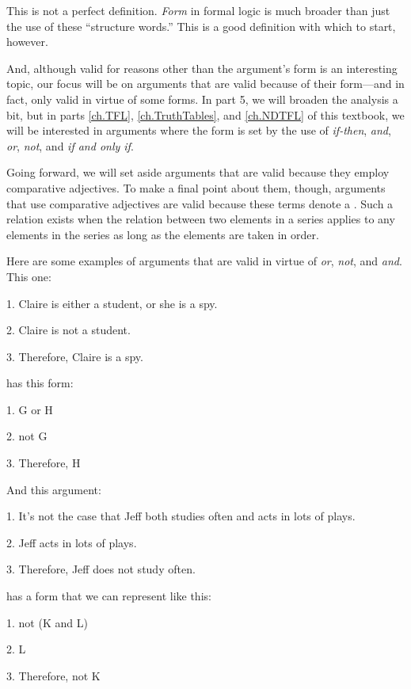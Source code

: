 \noindent This is not a perfect definition. \textit{Form} in formal logic is much broader than just the use of these ``structure words.'' This is a good definition with which to start, however.

And, although valid for reasons other than the argument's form is an interesting topic, our focus will be on arguments that are valid because of their form---and in fact, only valid in virtue of some forms. In part 5, we will broaden the analysis a bit, but in parts  \ref{ch.TFL}, \ref{ch.TruthTables}, and \ref{ch.NDTFL} of this textbook, we will be interested in arguments where the form is set by the use of  \textit{if-then}, \textit{and}, \textit{or}, \textit{not}, and \textit{if and only if}. 

\begin{notebox}
Going forward, we will set aside arguments that are valid because they employ comparative adjectives. To make a final point about them, though, arguments that use comparative adjectives are valid because these terms denote a . Such a relation exists when the relation between two elements in a series applies to any elements in the series as long as the elements are taken in order. 
\end{notebox}

Here are some examples of arguments that are valid in virtue of \textit{or}, \textit{not}, and \textit{and}.
This one:
	\begin{earg}
		\item[1.] Claire is either a student, or she is a spy.
		\item[2.] Claire is not a student.
		\item[3.] Therefore, Claire is a spy.
	\end{earg}
has this form:
	\begin{earg}
		\item[1.] G or H
		\item[2.] not G
		\item[3.] Therefore, H
	\end{earg}
And this argument:
	\begin{earg}
		\item[1.] It's not the case that Jeff both studies often and acts in lots of plays.
		\item[2.] Jeff acts in lots of plays.
		\item[3.] Therefore, Jeff does not study often.
	\end{earg}
has a form that we can represent like this:
	\begin{earg}
		\item[1.] not (K and L)
		\item[2.] L
		\item[3.] Therefore, not K
	\end{earg}

